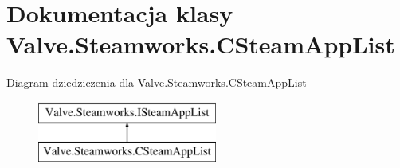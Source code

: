 \hypertarget{class_valve_1_1_steamworks_1_1_c_steam_app_list}{}\section{Dokumentacja klasy Valve.\+Steamworks.\+C\+Steam\+App\+List}
\label{class_valve_1_1_steamworks_1_1_c_steam_app_list}
Diagram dziedziczenia dla Valve.\+Steamworks.\+C\+Steam\+App\+List\begin{figure}[H]
\begin{center}
\leavevmode
\includegraphics[height=2.000000cm]{class_valve_1_1_steamworks_1_1_c_steam_app_list}
\end{center}
\end{figure}
